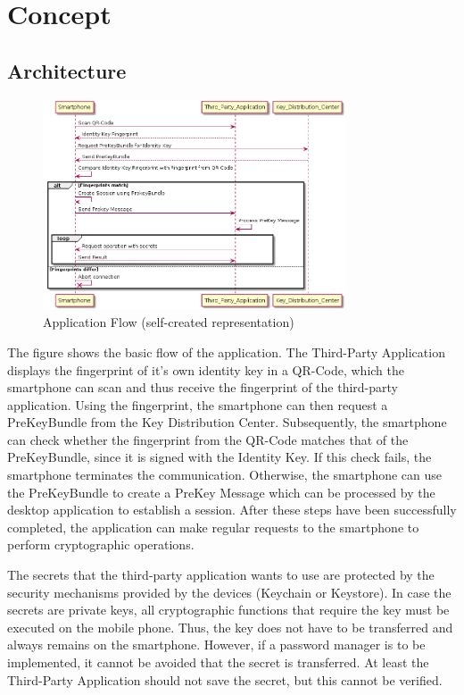 \documentclass[12pt,oneside,a4paper,parskip]{scrbook}
\begin{document}
\chapter{Concept}

\section{Architecture}
\label{sec:architecture}
\begin{figure}[ht]
	\centering
  \includegraphics[width=0.8\textwidth]{ressources/process_flow.png}
  \caption{Application Flow (self-created representation)}
  \label{fig:app_flo}
\end{figure}
The figure shows the basic flow of the application. The Third-Party Application displays the fingerprint of it's own identity key in a QR-Code, which the smartphone can scan and thus receive the fingerprint of the third-party application. Using the fingerprint, the smartphone can then request a PreKeyBundle from the Key Distribution Center. Subsequently, the smartphone can check whether the fingerprint from the QR-Code matches that of the PreKeyBundle, since it is signed with the Identity Key. If this check fails, the smartphone terminates the communication. Otherwise, the smartphone can use the PreKeyBundle to create a PreKey Message which can be processed by the desktop application to establish a session. After these steps have been successfully completed, the application can make regular requests to the smartphone to perform cryptographic operations. 

The secrets that the third-party application wants to use are protected by the security mechanisms provided by the devices (Keychain or Keystore).
In case the secrets are private keys, all cryptographic functions that require the key must be executed on the mobile phone. Thus, the key does not have to be transferred and always remains on the smartphone. However, if a password manager is to be implemented, it cannot be avoided that the secret is transferred. 
At least the Third-Party Application should not save the secret, but this cannot be verified.
\end{document}
